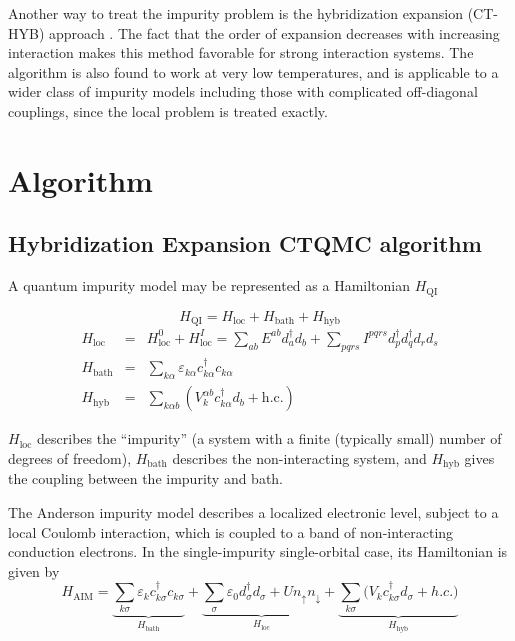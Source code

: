 Another way to treat the impurity problem is the hybridization expansion (CT-HYB)
approach \cite{RevModPhys.83.349, PhysRevB.75.155113, PhysRevB.80.235117,
PhysRevB.74.155107}. 
The fact that the order of expansion decreases with increasing 
interaction makes this method favorable for strong interaction systems. 
The algorithm is also found to work at very low temperatures, and is applicable
to a wider class of impurity models including those with complicated 
off-diagonal couplings, since the local problem is treated exactly. 

\section{Algorithm}
\label{sec:hyb-alg}
\subsection{Hybridization Expansion CTQMC algorithm}
A quantum impurity model may be represented as a Hamiltonian $H_\text{QI}$

\begin{equation}
H_\text{QI}=H_\text{loc}+H_\text{bath}+H_\text{hyb}
\end{equation}
\begin{eqnarray}
H_\text{loc}&=& H_\text{loc}^0+H_\text{loc}^I=
                \sum_{ab} E^{ab}d^\dagger_a d_b + 
                \sum_{pqrs}I^{pqrs}d^\dagger_p d^\dagger_q d_r d_s \\
H_\text{bath}&=&\sum_{k\alpha} 
                 \varepsilon_{k\alpha}c^\dagger_{k\alpha}c_{k\alpha} \\
H_\text{hyb}&=&\sum_{k\alpha b} ({V}_k^{\alpha b}c^\dagger_{k\alpha}d_b 
                +\text{h.c.})
\end{eqnarray}

$H_\text{loc}$ describes the ``impurity'' (a system
with a finite (typically small) number of degrees of freedom), 
$H_\text{bath}$ describes the non-interacting system, 
and $H_\text{hyb}$ gives the coupling between the impurity and bath.

The Anderson impurity model describes a localized electronic level, subject to 
a local Coulomb interaction, which is coupled to a band of non-interacting 
conduction electrons. In the  single-impurity single-orbital case, its 
Hamiltonian is given by
\begin{equation}
H_\text{AIM}= \underbrace{\sum_{k\sigma}
  \varepsilon_k c^\dagger_{k\sigma}c_{k\sigma}}_{H_\text{bath}} 
+  \underbrace{\sum_\sigma \varepsilon_0d^\dagger_\sigma d_\sigma 
  + Un_\uparrow n_\downarrow}_{H_\text{loc}}
+ \underbrace{\sum_{k\sigma}\Big(V_kc^\dagger_{k\sigma}d_\sigma+h.c.\Big)}
_{H_\text{hyb}}
\end{equation}


